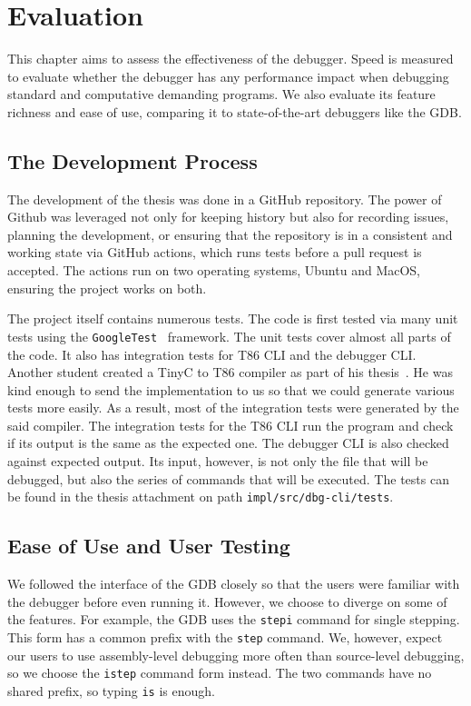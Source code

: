 \chapter{Evaluation}
This chapter aims to assess the effectiveness of the debugger. Speed is
measured to evaluate whether the debugger has any performance impact when
debugging standard and computative demanding programs. We also evaluate its
feature richness and ease of use, comparing it to state-of-the-art debuggers
like the GDB.

\section{The Development Process}
The development of the thesis was done in a GitHub repository. The power of
Github was leveraged not only for keeping history but also for recording
issues, planning the development, or ensuring that the repository is in a
consistent and working state via GitHub actions, which runs tests before a pull
request is accepted. The actions run on two operating systems, Ubuntu and
MacOS, ensuring the project works on both.

The project itself contains numerous tests. The code is first tested via many
unit tests using the \texttt{GoogleTest}~\cite{gtest} framework. The unit
tests cover almost all parts of the code. It also has integration tests for T86
CLI and the debugger CLI. Another student created a TinyC to T86 compiler as
part of his thesis~\cite{martintinyc}. He was kind enough to send the
implementation to us so that we could generate various tests more easily. As a
result, most of the integration tests were generated by the said compiler. The
integration tests for the T86 CLI run the program and check if its output is
the same as the expected one. The debugger CLI is also checked against expected
output. Its input, however, is not only the file that will be debugged, but
also the series of commands that will be executed. The tests can be found
in the thesis attachment on path \texttt{impl/src/dbg-cli/tests}.

\section{Ease of Use and User Testing}
We followed the interface of the GDB closely so that the users were familiar
with the debugger before even running it. However, we choose to diverge on some
of the features. For example, the GDB uses the \texttt{stepi} command for
single stepping. This form has a common prefix with the \texttt{step} command.
We, however, expect our users to use assembly-level debugging more often than
source-level debugging, so we choose the \texttt{istep} command form instead.
The two commands have no shared prefix, so typing \texttt{is} is enough.

